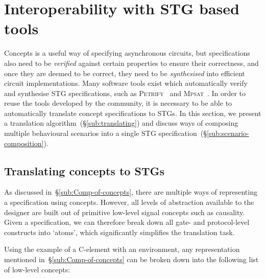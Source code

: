 \documentclass[british,compsoc]{IEEEtran}
\newcommand{\noun}[1]{\textsc{#1}}
\begin{document}
\vspace{-1mm}
\section{Interoperability with STG based tools\label{sec:interop-with-stg}}

Concepts is a useful way of specifying asynchronous circuits, but
specifications also need to be \emph{verified} against certain properties to ensure
their correctness, and once they are deemed to be correct, they need to
be \emph{synthesised} into efficient circuit implementations. Many software
tools exist which automatically verify and synthesise STG specifications,
such as \noun{Petrify}~\cite{Cortadella} and \noun{Mpsat}~\cite{khomenko2004detecting}.
In order to reuse the tools developed by the community, it is
necessary to be able to automatically translate concept specifications to STGs.
In this section, we present a translation algorithm~(\S\ref{sub:translating})
and discuss ways of composing multiple behavioural scenarios into a single STG specification~(\S\ref{sub:scenario-composition}).


\vspace{-2mm}
\subsection{Translating concepts to STGs\label{sub:translating}}

As discussed in~\S\ref{sub:Comp-of-concepts}, there are multiple ways of
representing a specification using concepts. However, all levels of
abstraction available to the designer are built out of primitive low-level
signal concepts such as causality. Given a specification, we can therefore
break down all gate- and protocol-level constructs into `atoms', which
significantly simplifies the translation task.

Using the example of a C-element with an environment, any representation
mentioned in~\S\ref{sub:Comp-of-concepts} can be broken down into the following
list of low-level concepts:
\end{document}
